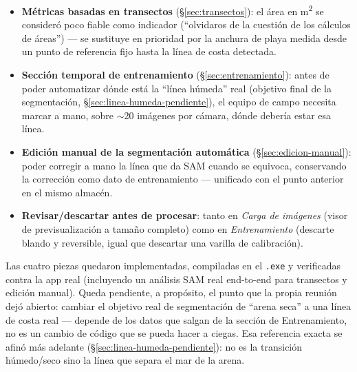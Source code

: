 \begin{itemize}[leftmargin=1.5em]
  \item \textbf{Métricas basadas en transectos} (\S\ref{sec:transectos}): el área en
        m\textsuperscript{2} se consideró poco fiable como indicador (``olvidaros de la
        cuestión de los cálculos de áreas'') — se sustituye en prioridad por la anchura de
        playa medida desde un punto de referencia fijo hasta la línea de costa detectada.
  \item \textbf{Sección temporal de entrenamiento} (\S\ref{sec:entrenamiento}): antes de poder
        automatizar dónde está la ``línea húmeda'' real (objetivo final de la segmentación,
        \S\ref{sec:linea-humeda-pendiente}), el equipo de campo necesita marcar a mano, sobre
        $\sim$20 imágenes por cámara, dónde debería estar esa línea.
  \item \textbf{Edición manual de la segmentación automática} (\S\ref{sec:edicion-manual}):
        poder corregir a mano la línea que da SAM cuando se equivoca, conservando la corrección
        como dato de entrenamiento — unificado con el punto anterior en el mismo almacén.
  \item \textbf{Revisar/descartar antes de procesar}: tanto en \textit{Carga de imágenes}
        (visor de previsualización a tamaño completo) como en \textit{Entrenamiento} (descarte
        blando y reversible, igual que descartar una varilla de calibración).
\end{itemize}

Las cuatro piezas quedaron implementadas, compiladas en el \texttt{.exe} y verificadas contra la
app real (incluyendo un análisis SAM real end-to-end para transectos y edición manual). Queda
pendiente, a propósito, el punto que la propia reunión dejó abierto: cambiar el objetivo real de
segmentación de ``arena seca'' a una línea de costa real — depende de los datos que salgan de la
sección de Entrenamiento, no es un cambio de código que se pueda hacer a ciegas. Esa referencia
exacta se afinó más adelante (\S\ref{sec:linea-humeda-pendiente}): no es la transición
húmedo/seco sino la línea que separa el mar de la arena.

